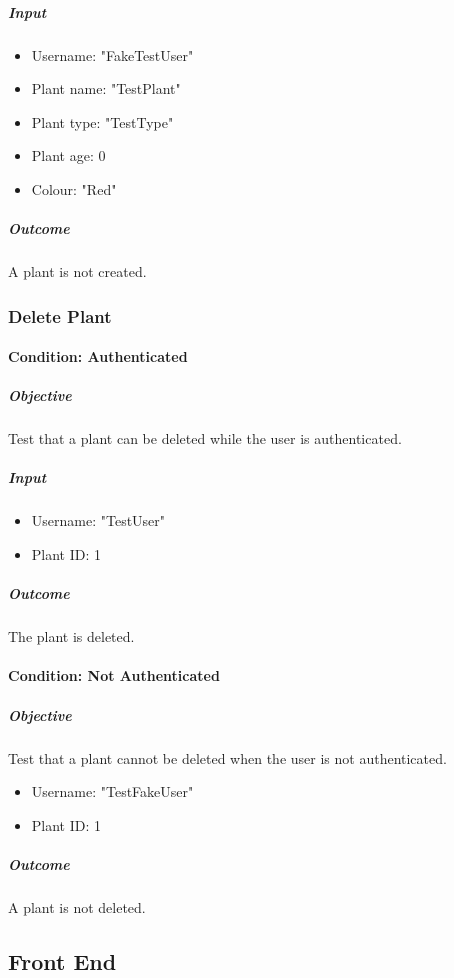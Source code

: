 \documentclass{article}
\begin{document}
		\subparagraph{Input}
		\begin{itemize}
			\item Username: "FakeTestUser"
			\item Plant name: "TestPlant"
			\item Plant type: "TestType"
			\item Plant age: 0
			\item Colour: "Red"
		\end{itemize}
		
		\subparagraph{Outcome}
		A plant is not created.
		
		\subsubsection{Delete Plant}
		
		\paragraph{Condition: Authenticated}
		\subparagraph{Objective}
		Test that a plant can be deleted while the user is authenticated.
		
		\subparagraph{Input}
		\begin{itemize}
			\item Username: "TestUser"
			\item Plant ID: 1
		\end{itemize}
		
		\subparagraph{Outcome}
		The plant is deleted.
		
		\paragraph{Condition: Not Authenticated}
		\subparagraph{Objective}
		Test that a plant cannot be deleted when the user is not authenticated.
		
		\begin{itemize}
			\item Username: "TestFakeUser"
			\item Plant ID: 1
		\end{itemize}
		
		\subparagraph{Outcome}
		A plant is not deleted.
		
	\subsection{Front End}
\end{document}
